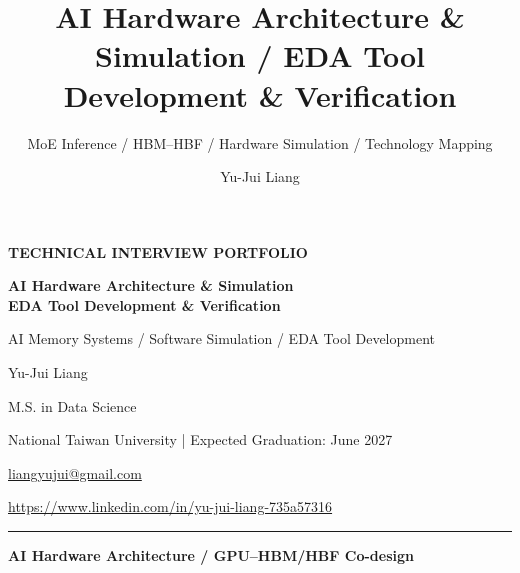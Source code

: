 \documentclass[aspectratio=169,10pt]{beamer}
\title[AI Systems / EDA]{AI Hardware Architecture \& Simulation / EDA Tool Development \& Verification}
\subtitle{MoE Inference / HBM--HBF / Hardware Simulation / Technology Mapping}
\author{Yu-Jui Liang}
\institute{National Taiwan University}
\date{}
\newcommand{\smalllabel}[1]{{\scriptsize\bfseries\color{Accent}\MakeUppercase{#1}}}
\begin{document}

{
\begin{frame}[plain]
  \vspace*{0.76cm}
  \smalllabel{TECHNICAL INTERVIEW PORTFOLIO}\par
  \vspace{0.47cm}
{\raggedright\fontsize{21}{27}\selectfont\bfseries\color{Ink}
  AI Hardware Architecture \& Simulation\\[2mm]
  EDA Tool Development \& Verification\par}
  \vspace{0.27cm}
  {\normalsize\color{Muted}AI Memory Systems \quad / \quad Software Simulation \quad / \quad EDA Tool Development\par}
  \vspace{0.61cm}
  {\Large\mdseries\color{Ink}Yu-Jui Liang\par}
  \vspace{0.09cm}
  {\normalsize\color{Muted}M.S. in Data Science\par}
  {\small\color{Muted}National Taiwan University \quad | \quad Expected Graduation: June 2027\par}
  \vspace{0.17cm}
  {\small\color{Muted}\href{mailto:liangyujui@gmail.com}{liangyujui@gmail.com}\par}
  \vspace{0.03cm}
  {\small\color{Muted}\href{https://www.linkedin.com/in/yu-jui-liang-735a57316}{https://www.linkedin.com/in/yu-jui-liang-735a57316}\par}
  \vfill
  {\color{Accent}\rule{\textwidth}{0.7pt}}\par\vspace{0.07cm}
  {\small\bfseries\color{Muted}
    AI Hardware Architecture \quad / \quad GPU--HBM/HBF Co-design\par}
\end{frame}}
\end{document}

